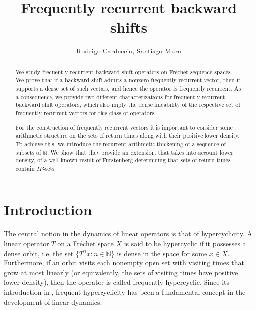 \documentclass[11pt]{amsart}
\title{Frequently recurrent backward shifts}
\author{Rodrigo Cardeccia, Santiago Muro}
\newcommand{\zN}{\mathbb N}
\begin{document}
\begin{abstract}
 We study  frequently recurrent backward shift operators on Fréchet sequence spaces. We prove that if a backward shift admits a nonzero frequently recurrent vector, then it supports a dense set of such vectors, and hence the operator is frequently recurrent. As a consequence, we provide two different characterizations for frequently recurrent backward shift operators,
which also imply the dense lineability of the respective set of
frequently recurrent vectors for this class of operators.

    For the construction of frequently recurrent vectors it is important to consider some arithmetic structure on the sets of return times along with their positive lower density. To achieve this, we introduce the recurrent arithmetic thickening of a sequence of subsets of $\zN$. We show that they provide an extension, that takes into account lower density, of a well-known result of Furstenberg  determining that sets of return times contain $IP$-sets. 
\end{abstract}

\maketitle






\section*{Introduction}

The central notion in the dynamics of linear operators is that of hypercyclicity. A linear operator \( T \) on a Fr\'echet space $X$ is said to be hypercyclic if it possesses a dense orbit, i.e. the set \( \{T^n x : n \in \mathbb{N}\} \) is dense in the space for some \( x \in X \).
Furthermore, if an orbit visits each nonempty open set with visiting times that grow at most linearly (or equivalently, the sets of visiting times have positive lower density), then the operator is called frequently hypercyclic. Since its introduction in \cite{BayGri06}, frequent hypercyclicity has been a fundamental concept in the development of linear dynamics.
\end{document}
